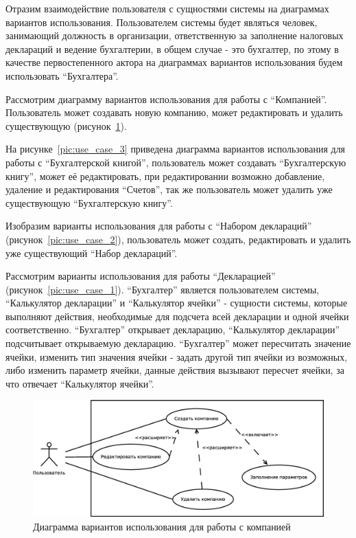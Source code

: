 \documentclass[14pt,a4paper]{reportmod}
\begin{document}
Отразим взаимодействие пользователя с сущностями системы на диаграммах вариантов использования. Пользователем системы будет являться человек, занимающий должность в организации, ответственную за заполнение налоговых деклараций и ведение бухгалтерии, в общем случае - это бухгалтер, по этому в качестве первостепенного актора на диаграммах вариантов использования будем использовать ``Бухгалтера''.

Рассмотрим диаграмму вариантов использования для работы с ``Компанией''. Пользователь может создавать новую компанию, может редактировать и удалить существующую (рисунок~\ref{pic:use_case_4}).

На рисунке~\ref{pic:use_case_3} приведена диаграмма вариантов использования для работы с ``Бухгалтерской книгой'', пользователь может создавать ``Бухгалтерскую книгу'', может её редактировать, при редактировании возможно добавление, удаление и редактирования ``Счетов'', так же пользователь может удалить уже существующую ``Бухгалтерскую книгу''.

Изобразим варианты использования для работы с ``Набором деклараций'' (рисунок~\ref{pic:use_case_2}), пользователь может создать, редактировать и удалить уже существующий ``Набор деклараций''.

Рассмотрим варианты использования для работы ``Декларацией'' (рисунок~\ref{pic:use_case_1}). ``Бухгалтер'' является пользователем системы, ``Калькулятор декларации'' и ``Калькулятор ячейки'' - сущности системы, которые выполняют действия, необходимые для подсчета всей декларации и одной ячейки соответственно. ``Бухгалтер'' открывает декларацию, ``Калькулятор декларации'' подсчитывает открываемую декларацию. ``Бухгалтер'' может пересчитать значение ячейки, изменить тип значения ячейки - задать другой тип ячейки из возможных, либо изменить параметр ячейки, данные действия вызывают пересчет ячейки, за что отвечает ``Калькулятор ячейки''.

\begin{figure}
  \centering
  \includegraphics[scale=0.4]{uml/usecase_4}
  \caption{Диаграмма вариантов использования для работы с компанией}
  \label{pic:use_case_4}
\end{figure}
\end{document}
